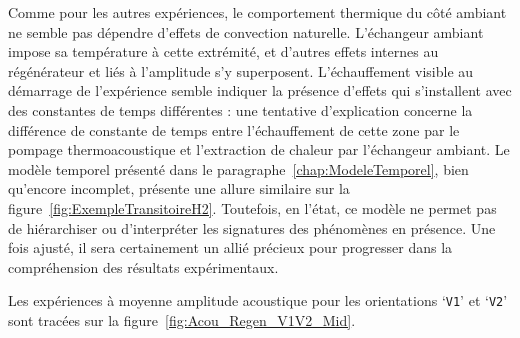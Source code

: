 Comme pour les autres expériences, le comportement thermique du côté ambiant ne semble pas dépendre d'effets de convection naturelle. L'échangeur ambiant impose sa température à cette extrémité, et d'autres effets internes au régénérateur et liés à l'amplitude s'y superposent. L'échauffement visible au démarrage de l'expérience semble indiquer la présence d'effets qui s'installent avec des constantes de temps différentes : une tentative d'explication concerne la différence de constante de temps entre l'échauffement de cette zone par le pompage thermoacoustique et l'extraction de chaleur par l'échangeur ambiant. Le modèle temporel présenté dans le paragraphe~\ref{chap:ModeleTemporel}, bien qu'encore incomplet, présente une allure similaire sur la figure~\ref{fig:ExempleTransitoireH2}. Toutefois, en l'état, ce modèle ne permet pas de hiérarchiser ou d'interpréter les signatures des phénomènes en présence. Une fois ajusté, il sera certainement un allié précieux pour progresser dans la compréhension des résultats expérimentaux.\bigskip



Les expériences à moyenne amplitude acoustique pour les orientations `\texttt{V1}' et `\texttt{V2}' sont tracées sur la figure~\ref{fig:Acou_Regen_V1V2_Mid}.\medskip

